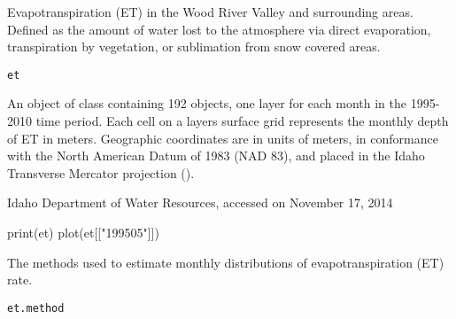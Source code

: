 \documentclass[a4paper]{book}
\begin{document}
%
\begin{Description}\relax
Evapotranspiration (ET) in the Wood River Valley and surrounding areas.
Defined as the amount of water lost to the atmosphere via direct evaporation, transpiration by vegetation, or sublimation from snow covered areas.
\end{Description}
%
\begin{Usage}
\begin{verbatim}
et
\end{verbatim}
\end{Usage}
%
\begin{Format}
An object of  class containing 192  objects, one layer for each month in the 1995-2010 time period.
Each cell on a layers surface grid represents the monthly depth of ET in meters.
Geographic coordinates are in units of meters, in conformance with the North American Datum of 1983 (NAD 83), and placed in the
Idaho Transverse Mercator projection ().
\end{Format}
%
\begin{Source}\relax
Idaho Department of Water Resources, accessed on November 17, 2014
\end{Source}
%
\begin{SeeAlso}\relax
{}
\end{SeeAlso}
%
\begin{Examples}
\begin{ExampleCode}
print(et)
plot(et[["199505"]])
\end{ExampleCode}
\end{Examples}
%
\begin{Description}\relax
The methods used to estimate monthly distributions of evapotranspiration (ET) rate.
\end{Description}
%
\begin{Usage}
\begin{verbatim}
et.method
\end{verbatim}
\end{Usage}
%
\end{document}
